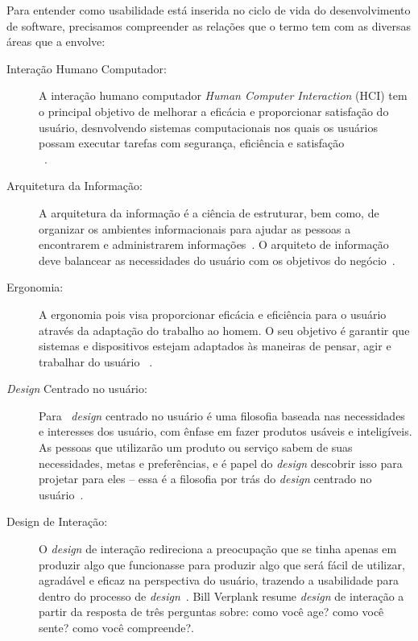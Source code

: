 Para entender como usabilidade está inserida no ciclo de vida do desenvolvimento de software, precisamos compreender as relações que o termo tem com as diversas áreas que a envolve: 

\begin{description}

\item[Interação Humano Computador:]

%
A interação humano computador \emph{Human Computer Interaction} (HCI) tem o principal objetivo de melhorar a eficácia e proporcionar satisfação do usuário, desnvolvendo sistemas computacionais nos quais os usuários possam executar tarefas com segurança, eficiência e satisfação \\ ~\cite{preece2007}.
	
\item[Arquitetura da Informação:]


A arquitetura da informação é a ciência de estruturar, bem como, de organizar os ambientes informacionais para ajudar as pessoas a encontrarem e administrarem informações~\cite{garret2003}.
%
O arquiteto de informação deve balancear as necessidades do usuário com os objetivos do negócio~\cite{rosenfeld1998}.

\item[Ergonomia:]
%
A ergonomia pois visa proporcionar eficácia e eficiência para o usuário através da adaptação do trabalho ao homem.
%
O seu objetivo é garantir que sistemas e dispositivos estejam adaptados às maneiras de pensar, agir e trabalhar do usuário~\cite{cybis2010} .

\item[\emph{Design} Centrado no usuário:]

Para~ \emph{design} centrado no usuário é uma filosofia baseada nas necessidades e interesses dos usuário, com ênfase em fazer produtos usáveis e inteligíveis. 
%
As pessoas que utilizarão um produto ou serviço sabem de suas necessidades, metas e preferências, e é papel do \emph{design} descobrir isso para projetar para eles -- essa é a filosofia por trás do \emph{design} centrado no usuário~\cite{saffer2010designing}.

\item[Design de Interação:]

O \emph{design} de interação redireciona a preocupação que se tinha apenas em produzir algo que funcionasse para produzir algo que será fácil de utilizar, agradável e eficaz na perspectiva do usuário, trazendo a usabilidade para dentro do processo de \emph{design}~\cite{preece2007}.
%
Bill Verplank resume \emph{design} de interação a partir da resposta de três perguntas sobre: como você age? como você sente? como você compreende?\cite{moggridge2006}. 
%



\end{description}
